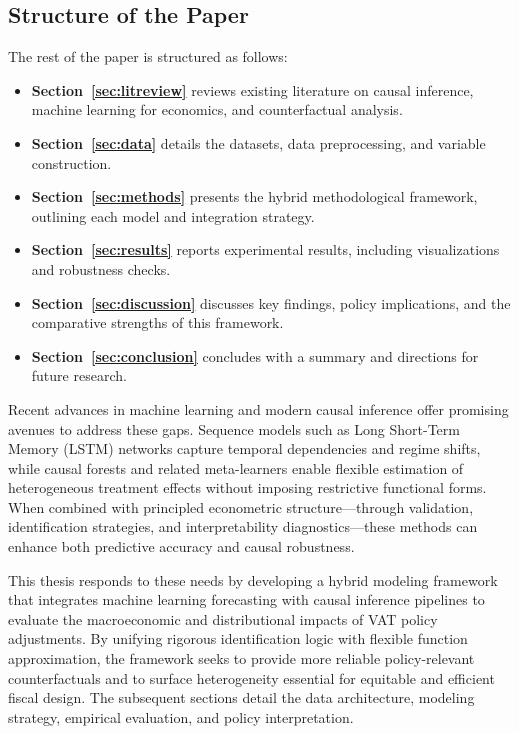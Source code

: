 \subsection{Structure of the Paper} \label{subsec:structure}

The rest of the paper is structured as follows:

\begin{itemize}
   
    \item \textbf{Section~\ref{sec:litreview}} reviews existing literature on causal inference, machine learning for economics, and counterfactual analysis.
    
    \item \textbf{Section~\ref{sec:data}} details the datasets, data preprocessing, and variable construction.
    
    \item \textbf{Section~\ref{sec:methods}} presents the hybrid methodological framework, outlining each model and integration strategy.
    
    \item \textbf{Section~\ref{sec:results}} reports experimental results, including visualizations and robustness checks.
    
    \item \textbf{Section~\ref{sec:discussion}} discusses key findings, policy implications, and the comparative strengths of this framework.
    
    \item \textbf{Section~\ref{sec:conclusion}} concludes with a summary and directions for future research.
\end{itemize}

Recent advances in machine learning and modern causal inference offer promising avenues to address these gaps. Sequence models such as Long Short-Term Memory (LSTM) networks capture temporal dependencies and regime shifts, while causal forests and related meta-learners enable flexible estimation of heterogeneous treatment effects without imposing restrictive functional forms. When combined with principled econometric structure—through validation, identification strategies, and interpretability diagnostics—these methods can enhance both predictive accuracy and causal robustness.

This thesis responds to these needs by developing a hybrid modeling framework that integrates machine learning forecasting with causal inference pipelines to evaluate the macroeconomic and distributional impacts of VAT policy adjustments. By unifying rigorous identification logic with flexible function approximation, the framework seeks to provide more reliable policy-relevant counterfactuals and to surface heterogeneity essential for equitable and efficient fiscal design. The subsequent sections detail the data architecture, modeling strategy, empirical evaluation, and policy interpretation.


